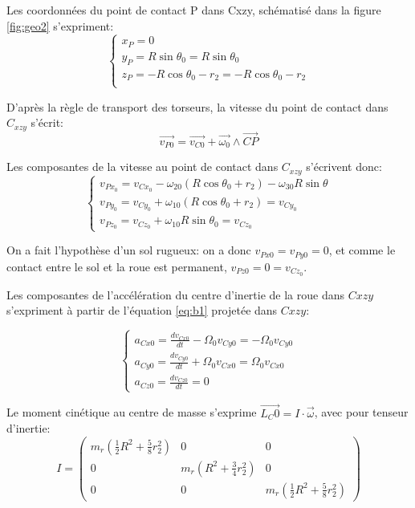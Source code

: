 Les coordonnées du point de contact P dans C{xzy}, schématisé dans la figure \ref{fig:geo2} s'expriment:
\begin{equation}
  \begin{cases}
    x_P=0\\
    y_P=R\sin{\theta_0}=R\sin{\theta_0}\\
    z_P=-R\cos{\theta_0}-r_2=-R\cos{\theta_0}-r_2\\
  \end{cases}
  \label{eq:b2}
\end{equation}

D'après la règle de transport des torseurs, la vitesse du point de contact dans $C_{xzy}$ s'écrit:
\begin{equation}
    \vec{v_{P0}}=\vec{v_{C0}}+\vec{\omega_0} \wedge \vec{CP}
  \label{eq:b3}
\end{equation}

Les composantes de la vitesse au point de contact dans $C_{xzy}$ s'écrivent donc:
\begin{equation}
  \begin{cases}
    v_{Px_0}=v_{Cx_0}-\omega_{20} (R\cos{\theta_0}+r_2) -\omega_{30} R\sin{\theta} \\
    v_{Py_0}=v_{Cy_0} + \omega_{10} (R\cos{\theta_0}+r_2)= v_{Cy_0}\\
    v_{Pz_0}=v_{Cz_0} + \omega_{10} R\sin{\theta_0} = v_{Cz_0}
  \end{cases}
  \label{eq:b4}
\end{equation}

On a fait l'hypothèse d'un sol rugueux: on a donc $v_{Px0}=v_{Py0}=0$, et comme le contact entre le sol et la roue est permanent, $v_{Pz0}=0=v_{Cz_0}$.


Les composantes de l'accélération du centre d'inertie de la roue dans $C{xzy}$ s'expriment à partir de l'équation \ref{eq:b1} projetée dans $C{xzy}$:

\begin{equation}
  \begin{cases}
    a_{Cx0}=\frac{dv_{Cx0}}{dt}-\Omega_0 v_{Cy0}=-\Omega_0 v_{Cy0} \\
    a_{Cy0}=\frac{dv_{Cy0}}{dt} + \Omega_0 v_{Cx0}=\Omega_0 v_{Cx0}\\
    a_{Cz0}=\frac{dv_{Cz0}}{dt} = 0
  \end{cases}
  \label{eq:b5}
\end{equation}

Le moment cinétique au centre de masse s'exprime $\vec{L_C0}=I \cdot \vec{\omega}$, avec pour tenseur d'inertie:
$$
I=
\begin{pmatrix}
   m_r (\frac{1}{2}R^2+\frac{5}{8}r_2^2) & 0  &  0 \\
  0 &  m_r(R^2+\frac{3}{4}r_2^2) & 0 \\
  0 & 0 & m_r (\frac{1}{2}R^2+\frac{5}{8}r_2^2)
\end{pmatrix}
$$

